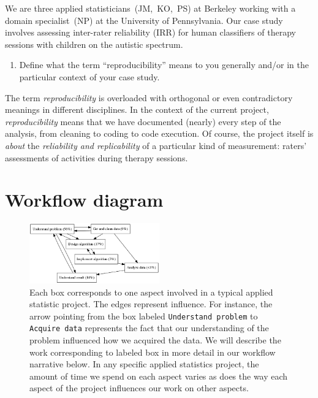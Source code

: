 \documentclass[]{article}
\begin{document}
We are three applied statisticians~(JM,~KO,~PS) at Berkeley working with a
domain specialist~(NP) at the University of Pennsylvania. Our case study
involves assessing inter-rater reliability (IRR) for human classifiers of
therapy sessions with children on the autistic spectrum.

\begin{enumerate}
\def\labelenumi{\arabic{enumi})}
\setcounter{enumi}{1}
\itemsep1pt\parskip0pt
\item
  Define what the term ``reproducibility'' means to you generally and/or
  in the particular context of your case study.
\end{enumerate}

The term \emph{reproducibility} is overloaded with orthogonal or even
contradictory meanings in different disciplines. In the context of the current
project, \emph{reproducibility} means that we have documented (nearly) every
step of the analysis, from cleaning to coding to code execution. Of course, the
project itself is \emph{about} the \emph{reliability and replicability} of a
particular kind of measurement: raters' assessments of activities during
therapy sessions.

\newpage

\section{Workflow diagram}\label{workflow-diagram}


\begin{figure}[h]
  \centering
    \includegraphics[width=0.5\textwidth]{work_process.png}
  \caption{Each box corresponds to one aspect involved in a typical applied
           statistic project.  The edges represent influence.  For instance,
           the arrow pointing from the box labeled \texttt{Understand problem}
           to \texttt{Acquire data} represents the fact that our understanding
           of the problem influenced how we acquired the data.  We will describe
           the work corresponding to labeled box in more detail in our
           workflow narrative below.  In any specific applied statistics project,
           the amount of time we spend on each aspect varies as does the
           way each aspect of the project influences our work on other
           aspects.}
\end{figure}
\end{document}
